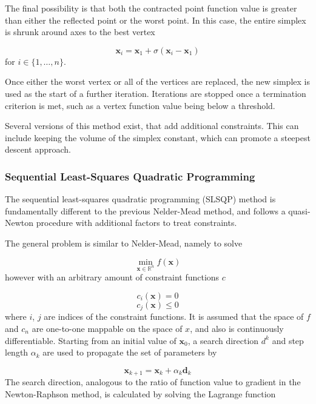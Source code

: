 The final possibility is that both the contracted point function value is greater 
than either the reflected point or the worst point. In this case, the entire simplex
is shrunk around axes to the best vertex

\begin{equation}
\mathbf{x}_i = \mathbf{x}_1 + \sigma \left(\mathbf{x}_i - \mathbf{x}_1 \right)
\end{equation}
%
for $i \in \{1, \dots, n\}$.

Once either the worst vertex or all of the vertices are replaced, the new simplex
is used as the start of a further iteration. Iterations are stopped once a termination
criterion is met, such as a vertex function value being below a threshold.

Several versions of this method exist, that add additional constraints. This can
include keeping the volume of the simplex constant, which can promote a steepest
descent approach.

\subsubsection{Sequential Least-Squares Quadratic Programming}
\label{subsubsec:slsqp}
The sequential least-squares quadratic programming (SLSQP) method is fundamentally
different to the previous Nelder-Mead method, and follows a quasi-Newton procedure
with additional factors to treat constraints.

The general problem is similar to Nelder-Mead, namely to solve

\begin{equation}
\min_{\mathbf{x} \in \mathbb{R}^n} f\left( \mathbf{x}\right)
\end{equation}
%
however with an arbitrary amount of constraint functions $c$

\begin{equation}
c_i \left(\mathbf{x} \right) = 0
\end{equation}
\begin{equation}
c_j \left(\mathbf{x} \right) \leq 0
\end{equation}
%
where $i$, $j$ are indices of the constraint functions.
It is assumed that the space of $f$ and $c_n$ are one-to-one mappable on the
space of $x$, and also is continuously differentiable. Starting from an initial
value of $\mathbf{x}_0$, a search direction $d^k$ and step length $\alpha_k$ are
used to propagate the set of parameters by

\begin{equation}
\mathbf{x}_{k+1} = \mathbf{x}_k + \alpha_k \mathbf{d}_k
\end{equation}
%
The search direction, analogous to the ratio of function value to gradient in the
Newton-Raphson method, is calculated by solving the Lagrange function

